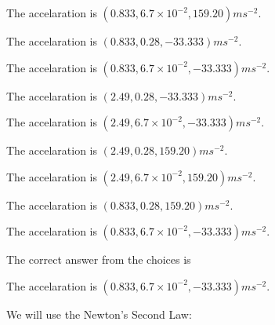 \documentclass[12pt]{article}
\begin{document}
 
 
The accelaration is $  %
(
0.833,
6.7 \times 10^{-2},
159.20)
ms^{-2} $.
 
 
The accelaration is $  %
(
0.833,
0.28,
-33.333)
ms^{-2} $.
 
 
The accelaration is $  %
(
0.833,
6.7 \times 10^{-2},
-33.333)
ms^{-2} $.
 
 
The accelaration is $  %
(
2.49,
0.28,
-33.333)
ms^{-2} $.
 
 
The accelaration is $  %
(
2.49,
6.7 \times 10^{-2},
-33.333)
ms^{-2} $.
 
 
The accelaration is $  %
(
2.49,
0.28,
159.20)
ms^{-2} $.
 
 
The accelaration is $  %
(
2.49,
6.7 \times 10^{-2},
159.20)
ms^{-2} $.
 
 
The accelaration is $  %
(
0.833,
0.28,
159.20)
ms^{-2} $.
 
 
\noindent{}
 
 
The accelaration is $  %
(
0.833,
6.7 \times 10^{-2},
-33.333)
ms^{-2} $.
 
 
\noindent{}
 
 
 
 
 
\noindent{}
 
 

The correct answer from the choices is


The accelaration is $  %
(
0.833,
6.7 \times 10^{-2},
-33.333)
ms^{-2} $.
 
 
 
\noindent{}
 
 

 
 
 
\noindent{}
 
 

We will use the Newton's Second Law:
 
\end{document}
